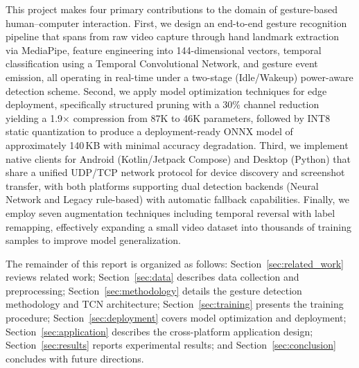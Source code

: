 This project makes four primary contributions to the domain of gesture-based human--computer interaction. First, we design an end-to-end gesture recognition pipeline that spans from raw video capture through hand landmark extraction via MediaPipe, feature engineering into 144-dimensional vectors, temporal classification using a Temporal Convolutional Network, and gesture event emission, all operating in real-time under a two-stage (Idle/Wakeup) power-aware detection scheme. Second, we apply model optimization techniques for edge deployment, specifically structured pruning with a 30\% channel reduction yielding a 1.9$\times$ compression from 87K to 46K parameters, followed by INT8 static quantization to produce a deployment-ready ONNX model of approximately 140\,KB with minimal accuracy degradation. Third, we implement native clients for Android (Kotlin/Jetpack Compose) and Desktop (Python) that share a unified UDP/TCP network protocol for device discovery and screenshot transfer, with both platforms supporting dual detection backends (Neural Network and Legacy rule-based) with automatic fallback capabilities. Finally, we employ seven augmentation techniques including temporal reversal with label remapping, effectively expanding a small video dataset into thousands of training samples to improve model generalization.

The remainder of this report is organized as follows:
Section~\ref{sec:related_work} reviews related work;
Section~\ref{sec:data} describes data collection and preprocessing;
Section~\ref{sec:methodology} details the gesture detection methodology
and TCN architecture;
Section~\ref{sec:training} presents the training procedure;
Section~\ref{sec:deployment} covers model optimization and deployment;
Section~\ref{sec:application} describes the cross-platform application
design;
Section~\ref{sec:results} reports experimental results; and
Section~\ref{sec:conclusion} concludes with future directions.
